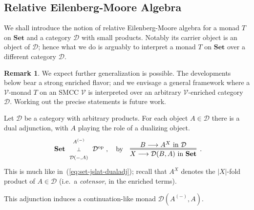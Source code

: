 \documentclass[9pt, preprint]{sigplanconf}
\theoremstyle{theorem}
\theoremstyle{definition}
\newtheorem{remark}[theorem]{Remark}
\newcommand{\cat}[1]{\mathcal{#1}}
\newcommand{\place}{{-}}
\newcommand{\op}{\mathrm{op}}
\newcommand{\Set}{\mathbf{Set}}
\newcommand{\Sets}{\Set}
\newcommand{\longto}{\longrightarrow}
\newcommand{\V}{\mathcal{V}}
\begin{document}
\subsection{Relative Eilenberg-Moore Algebra}
We shall introduce the notion of relative Eilenberg-Moore algebra for a
monad $T$ on $\Sets$ and a category $\cat{D}$ with small
products. Notably its carrier object is an object of $\cat{D}$; hence
what we do is arguably to interpret a monad $T$ on $\Sets$ over a
different category $\cat{D}$.

\begin{remark}
 We expect further generalization is possible. The developments below
 bear a strong enriched flavor; and we envisage a general framework
 where a $\V$-monad $T$ on an SMCC $\V$ is interpreted over an arbitrary
 $\V$-enriched category $\cat{D}$. Working out the precise statements is
 future work.
\end{remark}






Let $\cat{D}$ be a category with arbitrary products.
For each object $A\in\cat{D}$ there is a  dual adjunction,
with $A$ playing the role of a dualizing object.
\begin{equation}\label{eq:dual-adj-cotensor-hom}
 \vcenter{  \xymatrix@R-1.2em@C-1em{
    \Set \ar@/^/[rr]^-{A^{(\place)}} \ar@{}[rr]|-{\bot}
    &&  \cat{D}^{\op} \ar@/^/[ll]^-{\cat{D}(\place, A)}
}
},
\quad\text{by}\quad
\vcenter{\infer={X\longto \cat{D}(B, A) \text{ in $\Sets$}}{B \longto
A^{X}\text{ in $\cat{D}$}}}\enspace.
\end{equation}
This is much like
in~(\ref{eq:set-jslat-dualadj}); recall that $A^{X}$ denotes the
$|X|$-fold
product of $A\in\cat{D}$ (i.e.\ a \emph{cotensor}, in the enriched
terms).

This adjunction induces
a continuation-like monad $\cat{D}(A^{(\place)}, A)$.
\end{document}
